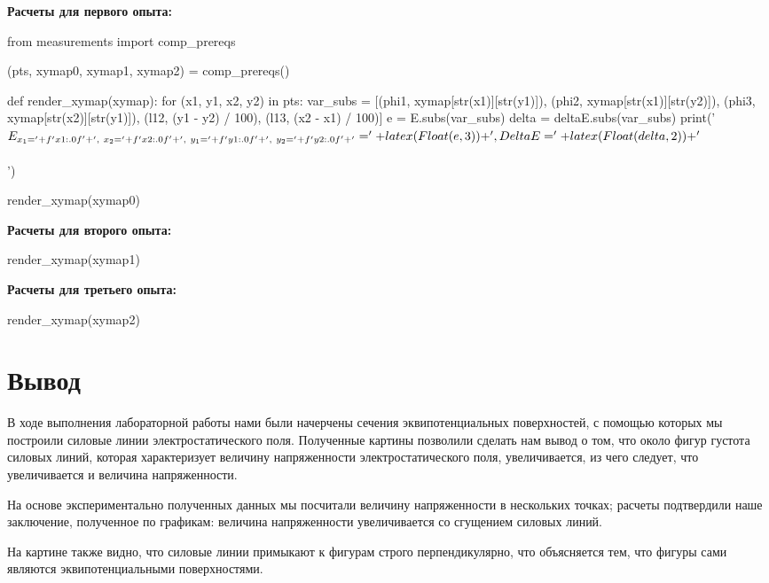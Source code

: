 \documentclass[12pt, a4paper]{article}
\begin{document}
\noindent\textbf{Расчеты для первого опыта:}\\

\noindent
\begin{sympycode}
from measurements import comp_prereqs

(pts, xymap0, xymap1, xymap2) = comp_prereqs()

def render_xymap(xymap):
  for (x1, y1, x2, y2) in pts:
    var_subs = [(phi1, xymap[str(x1)][str(y1)]),
                (phi2, xymap[str(x1)][str(y2)]),
                (phi3, xymap[str(x2)][str(y1)]),
                (l12, (y1 - y2) / 100),
                (l13, (x2 - x1) / 100)]
    e = E.subs(var_subs)
    delta = deltaE.subs(var_subs)
    print('$E_{x_1 = ' + f'{x1:.0f}' + ',\ x_2 = ' + f'{x2:.0f}' + ',\ y_1 = ' + f'{y1:.0f}' + ',\ y_2 = ' + f'{y2:.0f}' + '} = '
          + latex(Float(e, 3)) + ',\ \\Delta E = ' + latex(Float(delta, 2)) + '$\\\\')

render_xymap(xymap0)
\end{sympycode}

\noindent\textbf{Расчеты для второго опыта:}\\

\noindent
\begin{sympycode}
render_xymap(xymap1)
\end{sympycode}

\noindent\textbf{Расчеты для третьего опыта:}\\

\noindent
\begin{sympycode}
render_xymap(xymap2)
\end{sympycode}

\section*{Вывод}

В ходе выполнения лабораторной работы нами были начерчены сечения
эквипотенциальных поверхностей, с помощью которых мы построили силовые линии
электростатического поля. Полученные картины позволили сделать нам вывод о том,
что около фигур густота силовых линий, которая характеризует величину напряженности
электростатического поля, увеличивается, из чего следует, что увеличивается и
величина напряженности.

На основе экспериментально полученных данных мы посчитали величину напряженности
в нескольких точках; расчеты подтвердили наше заключение, полученное по графикам:
величина напряженности увеличивается со сгущением силовых линий.

На картине также видно, что силовые линии примыкают к фигурам строго перпендикулярно,
что объясняется тем, что фигуры сами являются эквипотенциальными поверхностями.
\end{document}
